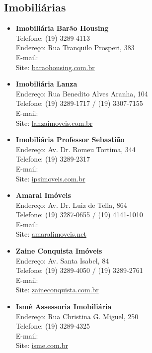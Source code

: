 \subsection{Imobiliárias}

\begin{itemize}
\item   \textbf{Imobiliária Barão Housing}
        \\Telefone: (19) 3289-4113
        \\Endereço: Rua Tranquilo Prosperi, 383
        \\E-mail: 
        \\Site: \url{baraohousing.com.br}

\item   \textbf{Imobiliária Lanza}
		\\Endereço: Rua Benedito Alves Aranha, 104
		\\Telefone: (19) 3289-1717 / (19) 3307-7155
		\\E-mail: 
		\\Site: \url{lanzaimoveis.com.br}

\item   \textbf{Imobiliária Professor Sebastião}
		\\Endereço: Av. Dr. Romeu Tortima, 344
		\\Telefone: (19) 3289-2317
		\\E-mail: 
		\\Site: \url{ipsimoveis.com.br}

\item   \textbf{Amaral Imóveis}
		\\Endereço: Av. Dr. Luiz de Tella, 864
		\\Telefone: (19) 3287-0655 / (19) 4141-1010
		\\E-mail: 
		\\Site: \url{amaralimoveis.net}

\item   \textbf{Zaine Conquista Imóveis}
		\\Endereço: Av. Santa Isabel, 84
		\\Telefone: (19) 3289-4050 / (19) 3289-2761
		\\E-mail: 
		\\Site: \url{zaineconquista.com.br}

\item   \textbf{Ismê Assessoria Imobiliária}
		\\Endereço: Rua Christina G. Miguel, 250
		\\Telefone: (19) 3289-4325
		\\E-mail: 
		\\Site: \url{isme.com.br}


\end{itemize}
